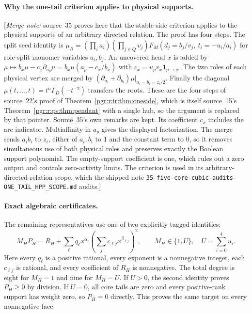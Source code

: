 \documentclass[11pt]{article}
\numberwithin{equation}{section}
\theoremstyle{definition}\newtheorem{definition}[theorem]{Definition}\newtheorem{remark}[theorem]{Remark}
\newcommand{\mnote}[1]{[\textit{Merge note:} #1]}
\begin{document}
\paragraph{Why the one-tail criterion applies to physical supports.}
\mnote{source~35 proves here that the stable-side criterion applies to the
physical supports of an arbitrary directed relation. The proof has four
steps. The split seed identity is
$\mu_B=(\prod_ia_i)(\prod_{j\in Q}v_j)F_M(d_j=b_j/v_j,\ t_i=-u_i/a_i)$ for
role-split monomer variables $a_i,b_j$. An uncovered head $x$ is added by
$\mu\mapsto b_x\mu-c_x\partial_{a_p}\mu=b_x\mu(a_p-c_x/b_x)$ with
$c_x=u_pv_x\mathbf1_{p\to x}$. The two roles of each physical vertex are
merged by $(\partial_{a_i}+\partial_{b_i})\mu|_{a_i=b_i=z_i/2}$. Finally
the diagonal $\mu(t,\ldots,t)=t^n\Gamma_D(-t^{-2})$ transfers the roots.
These are the four steps of source~22's proof of
Theorem~\ref{pgr:r:ir:thm:oneside}, which is itself source~15's
Theorem~\ref{pgr:r:ps:thm:pendant} with a single hub, so the argument is
replaced by that pointer. Source~35's own remarks are kept. Its
coefficient $c_x$ includes the arc indicator. Multiaffinity in $a_p$
gives the displayed factorization. The merge sends $a_ib_i$ to $z_i$,
either of $a_i,b_i$ to $1$ and the constant term to $0$, so it removes
simultaneous use of both physical roles and preserves exactly the Boolean
support polynomial. The empty-support coefficient is one, which rules out
a zero output and controls zero-activity limits. The criterion is used in
its arbitrary-directed-relation scope, which the shipped note
\nolinkurl{35-five-core-cubic-audits-ONE_TAIL_HPP_SCOPE.md} audits.}

\paragraph{Exact algebraic certificates.}
The remaining representatives use one of two explicitly tagged identities:
\begin{equation}\label{pgr:s:fq:eq:certificate}
 M_H P_H=R_H+\sum_{\ell}q_\ell x^{\alpha_\ell}
       \left(\sum_j c_{\ell j}x^{\beta_{\ell j}}\right)^2,
 \qquad M_H\in\{1,U\},\quad U=\sum_{i=0}^4u_i.
\end{equation}
Here every $q_\ell$ is a positive rational, every exponent is a nonnegative integer, each $c_{\ell j}$ is rational, and every coefficient of $R_H$ is nonnegative. The total degree is eight for $M_H=1$ and nine for $M_H=U$. If $U>0$, the second identity proves $P_H\ge0$ by division. If $U=0$, all core tails are zero and every positive-rank support has weight zero, so $P_H=0$ directly. This proves the same target on every nonnegative face.
\end{document}
